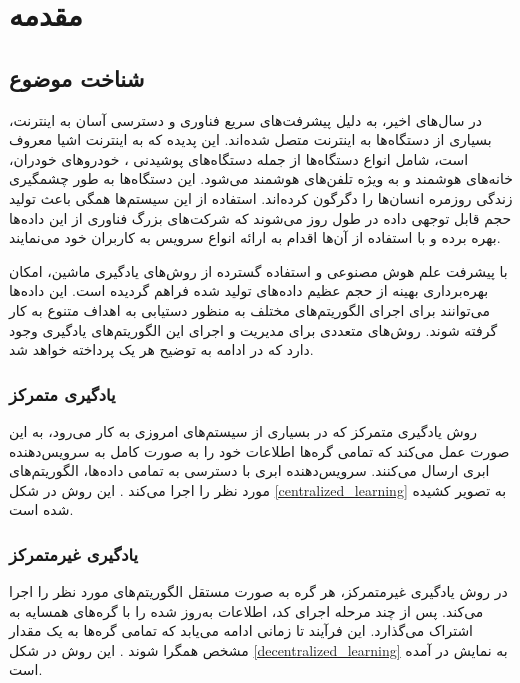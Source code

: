 \chapter{مقدمه}

\section{شناخت موضوع}
در سال‌های اخیر، به دلیل پیشرفت‌های سریع فناوری و دسترسی آسان به اینترنت، بسیاری از دستگاه‌ها به اینترنت متصل شده‌اند. این پدیده که به اینترنت اشیا%
معروف است، شامل انواع دستگاه‌ها از جمله دستگاه‌های پوشیدنی%
%
، خودروهای خودران، خانه‌های هوشمند%
و به ویژه تلفن‌های هوشمند%
می‌شود. این دستگاه‌ها به طور چشمگیری زندگی روزمره انسان‌ها را دگرگون کرده‌اند. استفاده از این سیستم‌ها همگی باعث تولید حجم قابل توجهی داده در طول روز می‌شوند که شرکت‌های بزرگ فناوری از این داده‌ها بهره برده و با استفاده از آن‌ها اقدام به ارائه انواع سرویس به کاربران خود می‌نمایند.

با پیشرفت علم هوش مصنوعی و استفاده گسترده از روش‌های یادگیری ماشین، امکان بهره‌برداری بهینه از حجم عظیم داده‌های تولید شده فراهم گردیده است. این داده‌ها می‌توانند برای اجرای الگوریتم‌های مختلف به منظور دستیابی به اهداف متنوع به کار گرفته شوند. روش‌های متعددی برای مدیریت و اجرای این الگوریتم‌های یادگیری وجود دارد که در ادامه به توضیح هر یک پرداخته خواهد شد.

\subsection{
	یادگیری متمرکز%
}
روش یادگیری متمرکز که در بسیاری از سیستم‌های امروزی به کار می‌رود، به این صورت عمل می‌کند که تمامی گره‌ها%
اطلاعات خود را به صورت کامل به سرویس‌دهنده ابری%
ارسال می‌کنند. سرویس‌دهنده ابری با دسترسی به تمامی داده‌ها، الگوریتم‌های مورد نظر را اجرا می‌کند
\cite{elbir2022family}.
این روش در شکل
\ref{centralized_learning}
به تصویر کشیده شده است.


\subsection{
	یادگیری غیرمتمرکز%
}
در روش یادگیری غیرمتمرکز، هر گره به صورت مستقل الگوریتم‌های مورد نظر را اجرا می‌کند. پس از چند مرحله اجرای کد، اطلاعات به‌روز شده را با گره‌های همسایه به اشتراک می‌گذارد. این فرآیند تا زمانی ادامه می‌یابد که تمامی گره‌ها به یک مقدار مشخص همگرا شوند
\cite{zhou2019edge}.
این روش در شکل
\ref{decentralized_learning}
به نمایش در آمده است.

